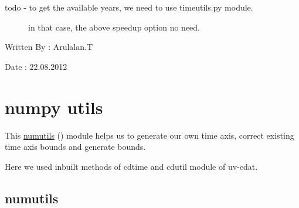 \documentclass[letterpaper,10pt,english]{sphinxmanual}
\begin{document}
\begin{fulllineitems}
\begin{description}
\begin{description}
\item[{todo - to get the available years, we need to use timeutils.py module.}] \leavevmode
in that case, the above speedup option no need.

\end{description}

\end{description}

Written By : Arulalan.T

Date : 22.08.2012

\end{fulllineitems}



\section{numpy utils}
\label{others:numpy-utils}
This {\hyperref[others:numutils]{numutils}} () module helps us to generate our own time axis, correct existing time axis bounds and generate bounds.

Here we used inbuilt methods of cdtime and cdutil module of uv-cdat.


\subsection{numutils}
\label{others:id1}\label{others:numutils}\label{others:module-numutils}\label{others:module-numutis.py}
\end{document}
